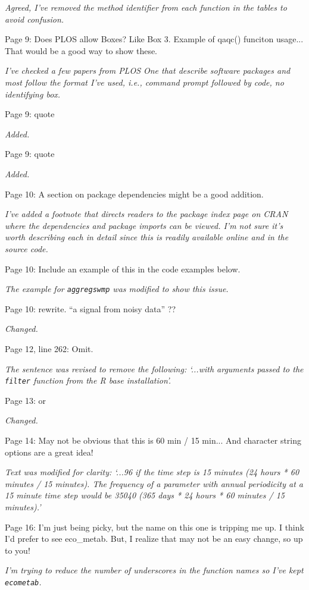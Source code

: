 \documentclass[letterpaper,12pt]{article}\usepackage[]{graphicx}\usepackage[]{color}
\begin{document}
{\it Agreed, I've removed the method identifier from each function in the tables to avoid confusion.}

Page 9: Does PLOS allow Boxes? Like Box 3. Example of qaqc() funciton usage... That would be a good way to show these.

{\it I've checked a few papers from PLOS One that describe software packages and most follow the format I've used, i.e., command prompt followed by code, no identifying box.}

Page 9: quote

{\it Added.}

Page 9: quote

{\it Added.}

Page 10: A section on package dependencies might be a good addition.

{\it I've added a footnote that directs readers to the package index page on CRAN where the dependencies and package imports can be viewed.  I'm not sure it's worth describing each in detail since this is readily available online and in the source code.} 

Page 10: Include an example of this in the code examples below.

{\it The example for \texttt{aggregswmp} was modified to show this issue.}

Page 10: rewrite. ``a signal from noisy data'' ??

{\it Changed.}

Page 12, line 262: Omit.

{\it The sentence was revised to remove the following: `...with arguments passed to the \texttt{filter} function from the R base installation'.}

Page 13: or

{\it Changed.}

Page 14: May not be obvious that this is 60 min / 15 min... And character string options are a great idea!

{\it Text was modified for clarity: `...96 if the time step is 15 minutes (24 hours * 60 minutes / 15 minutes).  The frequency of a parameter with annual periodicity at a 15 minute time step would be 35040 (365 days * 24 hours * 60 minutes / 15 minutes).'}

Page 16: I'm just being picky, but the name on this one is tripping me up. I think I'd prefer to see eco\_metab. But, I realize that may not be an easy change, so up to you!

{\it I'm trying to reduce the number of underscores in the function names so I've kept \texttt{ecometab}.}
\end{document}
